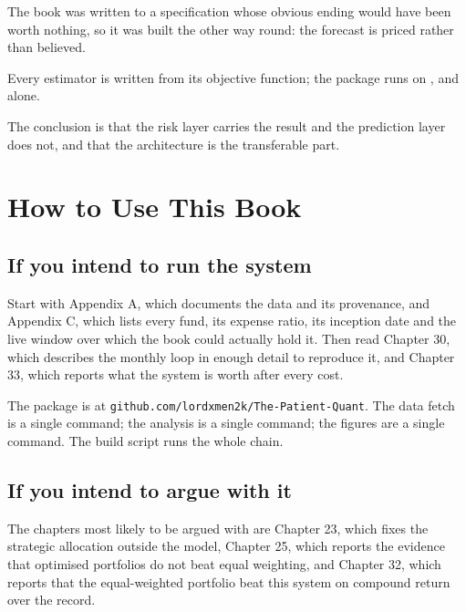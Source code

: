\begin{keytakeaways}
\item The book was written to a specification whose obvious ending would
have been worth nothing, so it was built the other way round: the
forecast is priced rather than believed.
\item Every estimator is written from its objective function; the package
runs on ,  and  alone.
\item The conclusion is that the risk layer carries the result and the
prediction layer does not, and that the architecture is the transferable
part.
\end{keytakeaways}
\clearpage

\chapter*{How to Use This Book}
\thispagestyle{plain}

\section*{If you intend to run the system}

Start with Appendix A, which documents the data and its provenance, and
Appendix C, which lists every fund, its expense ratio, its inception date
and the live window over which the book could actually hold it. Then read
Chapter 30, which describes the monthly loop in enough detail to
reproduce it, and Chapter 33, which reports what the system is worth
after every cost.

The package is at \texttt{github.com/lordxmen2k/The-Patient-Quant}. The
data fetch is a single command; the analysis is a single command; the
figures are a single command. The build script runs the whole chain.

\section*{If you intend to argue with it}

The chapters most likely to be argued with are Chapter 23, which fixes the
strategic allocation outside the model, Chapter 25, which reports the
evidence that optimised portfolios do not beat equal weighting, and
Chapter 32, which reports that the equal-weighted portfolio beat this
system on compound return over the record.


